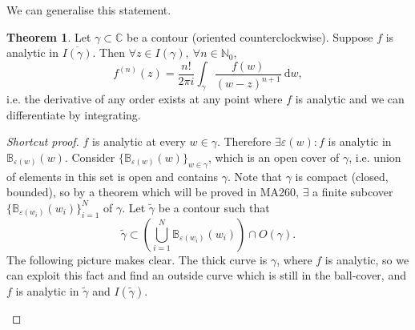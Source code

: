 \documentclass[a4paper]{article}
\theoremstyle{definition}
\newtheorem{thm}[defn]{Theorem}
\begin{document}
We can generalise this statement.
\begin{thm}
\label{thm:cauchydiffform}
Let $\gamma \subset \mathbb C$ be a contour (oriented counterclockwise). Suppose $f$ is analytic in $\overline{I(\gamma)}$. Then $\forall z\in I(\gamma),\ \forall n\in \mathbb N_0$,
\[
f^{(n)}(z) = \frac{n!}{2\pi i} \int_\gamma \frac{f(w)}{(w-z)^{n+1}} \ \mathrm d w,
\]
i.e. the derivative of any order exists at any point where $f$ is analytic and we can differentiate by integrating.
\end{thm}
\begin{proof}[Shortcut proof]
$f$ is analytic at every $w\in \gamma$. Therefore $\exists \varepsilon(w) : f$ is analytic in $\mathbb B_{\varepsilon(w)} (w)$. Consider $\{\mathbb B_{\varepsilon(w)}(w)\}_{w\in \gamma}$, which is an open cover of $\gamma$, i.e. union of elements in this set is open and contains $\gamma$. Note that $\gamma$ is compact (closed, bounded), so by a theorem which will be proved in MA260, $\exists$ a finite subcover $\{\mathbb B_{\varepsilon(w_i)} (w_i)\}_{i=1}^N$ of $\gamma$. Let $\widetilde{\gamma}$ be a contour such that
\[
\widetilde{\gamma} \subset \left( \bigcup_{i=1}^N \mathbb B_{\varepsilon(w_i)} (w_i) \right) \cap O(\gamma).
\]
The following picture makes clear. The thick curve is $\gamma$, where $f$ is analytic, so we can exploit this fact and find an outside curve which is still in the ball-cover, and $f$ is analytic in $\widetilde{\gamma}$ and $I(\widetilde{\gamma})$.
\begin{center}
\end{center}
\end{proof}
\end{document}
